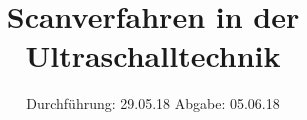 

\subject{V704}
\title{Scanverfahren in der Ultraschalltechnik}
\date{%
  Durchführung: 29.05.18
  \hspace{3em}
  Abgabe: 05.06.18
}



\maketitle
\thispagestyle{empty}
\tableofcontents
\newpage




\printbibliography{}



